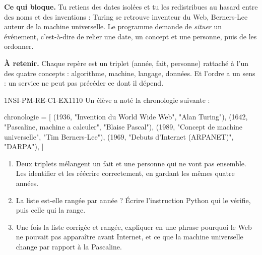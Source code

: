 

\textbf{Ce qui bloque.} Tu retiens des dates isolées et tu les redistribues au hasard entre
des noms et des inventions : Turing se retrouve inventeur du Web, Berners-Lee auteur de la
machine universelle. Le programme demande de \emph{situer} un événement, c'est-à-dire de
relier une date, un concept et une personne, puis de les ordonner.

\textbf{À retenir.} Chaque repère est un triplet (année, fait, personne) rattaché à l'un des
quatre concepts : algorithme, machine, langage, données. Et l'ordre a un sens : un service ne
peut pas précéder ce dont il dépend.

\begin{exercice}{1NSI-PM-RE-C1-EX1}{1}{10}
Un élève a noté la chronologie suivante :
\begin{python}
chronologie = [
    (1936, "Invention du World Wide Web", "Alan Turing"),
    (1642, "Pascaline, machine a calculer", "Blaise Pascal"),
    (1989, "Concept de machine universelle", "Tim Berners-Lee"),
    (1969, "Debuts d'Internet (ARPANET)", "DARPA"),
]
\end{python}
\begin{enumerate}
  \item Deux triplets mélangent un fait et une personne qui ne vont pas ensemble. Les
        identifier et les réécrire correctement, en gardant les mêmes quatre années.
  \item La liste est-elle rangée par année ? Écrire l'instruction Python qui le vérifie,
        puis celle qui la range.
  \item Une fois la liste corrigée et rangée, expliquer en une phrase pourquoi le Web ne
        pouvait pas apparaître avant Internet, et ce que la machine universelle change par
        rapport à la Pascaline.
\end{enumerate}
\end{exercice}

